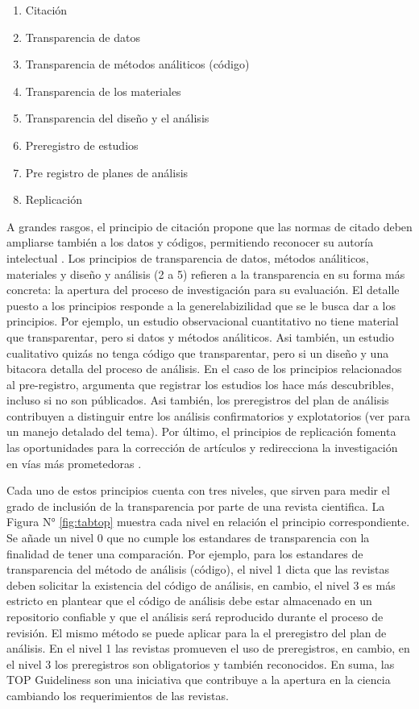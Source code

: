 \documentclass[
]{book}
\providecommand{\tightlist}{%
  \setlength{\itemsep}{0pt}\setlength{\parskip}{0pt}}
\begin{document}
\begin{enumerate}
\def\labelenumi{\arabic{enumi}.}
\tightlist
\item
  Citación
\item
  Transparencia de datos
\item
  Transparencia de métodos análiticos (código)
\item
  Transparencia de los materiales
\item
  Transparencia del diseño y el análisis
\item
  Preregistro de estudios
\item
  Pre registro de planes de análisis
\item
  Replicación
\end{enumerate}

A grandes rasgos, el principio de citación propone que las normas de citado deben ampliarse también a los datos y códigos, permitiendo reconocer su autoría intelectual \citep{nosek_Promoting_2015}. Los principios de transparencia de datos, métodos análiticos, materiales y diseño y análisis (2 a 5) refieren a la transparencia en su forma más concreta: la apertura del proceso de investigación para su evaluación. El detalle puesto a los principios responde a la generelabizilidad que se le busca dar a los principios. Por ejemplo, un estudio observacional cuantitativo no tiene material que transparentar, pero si datos y métodos análiticos. Asi también, un estudio cualitativo quizás no tenga código que transparentar, pero si un diseño y una bitacora detalla del proceso de análisis. En el caso de los principios relacionados al pre-registro, \citet{nosek_Promoting_2015} argumenta que registrar los estudios los hace más descubribles, incluso si no son públicados. Asi también, los preregistros del plan de análisis contribuyen a distinguir entre los análisis confirmatorios y explotatorios (ver \citet{nosek_preregistration_2018} para un manejo detalado del tema). Por último, el principios de replicación fomenta las oportunidades para la corrección de artículos y redirecciona la investigación en vías más prometedoras \citep{nosek_Promoting_2015}.

Cada uno de estos principios cuenta con tres niveles, que sirven para medir el grado de inclusión de la transparencia por parte de una revista cientifica. La Figura N° \ref{fig:tabtop} muestra cada nivel en relación el principio correspondiente. Se añade un nivel 0 que no cumple los estandares de transparencia con la finalidad de tener una comparación. Por ejemplo, para los estandares de transparencia del método de análisis (código), el nivel 1 dicta que las revistas deben solicitar la existencia del código de análisis, en cambio, el nivel 3 es más estricto en plantear que el código de análisis debe estar almacenado en un repositorio confiable y que el análisis será reproducido durante el proceso de revisión. El mismo método se puede aplicar para la el preregistro del plan de análisis. En el nivel 1 las revistas promueven el uso de preregistros, en cambio, en el nivel 3 los preregistros son obligatorios y también reconocidos. En suma, las TOP Guideliness son una iniciativa que contribuye a la apertura en la ciencia cambiando los requerimientos de las revistas.
\end{document}
